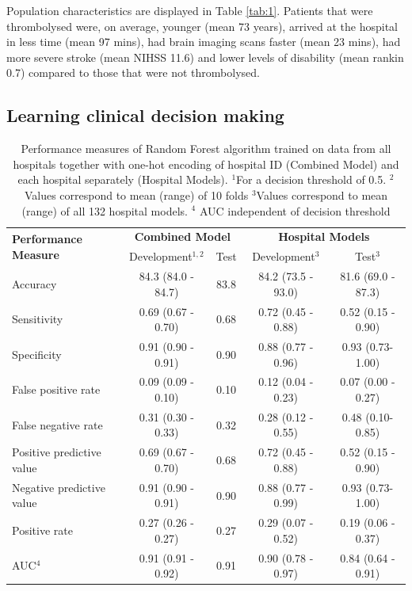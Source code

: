 \documentclass[12pt,a4paper, pdftex]{elsarticle}
\newcommand{\crjFIXME}[1]{\textcolor{blue}{[\textbf{FIXME} \textsl{#1}]}}
\begin{document}
Population characteristics are displayed in Table \ref{tab:1}. Patients that were thrombolysed were, on average, younger (mean 73 years), arrived at the hospital in less time (mean 97 mins), had brain imaging scans faster (mean 23 mins), had more severe stroke (mean NIHSS 11.6) and lower levels of disability (mean rankin 0.7) compared to those that were not thrombolysed. 


\subsection{Learning clinical decision making}



    \begin{table}[h!]
        \centering
        \begin{tabular}{|l|c|c|c|c|}
        \toprule
        \multirow{2}{*}{\bfseries Performance Measure} & 
        \multicolumn{2}{c|}{\bfseries Combined Model} &
        \multicolumn{2}{c|}{\bfseries Hospital Models} \\
        \cmidrule(lr){2-3}
        \cmidrule(lr){4-5}
        & Development$^{1,2}$ & Test & Development$^3$ & Test$^3$ \\ 
        \hline 
        Accuracy & 84.3 (84.0 - 84.7)& 83.8 & 84.2 (73.5 - 93.0) & 81.6 (69.0 - 87.3)\\
        Sensitivity & 0.69 (0.67 - 0.70)& 0.68 & 0.72 (0.45 - 0.88)& 0.52 (0.15 - 0.90)\\
        Specificity & 0.91 (0.90 - 0.91)& 0.90 & 0.88 (0.77 - 0.96)& 0.93 (0.73-1.00)\\
        False positive rate & 0.09 (0.09 - 0.10)& 0.10 & 0.12 (0.04 - 0.23)& 0.07 (0.00 - 0.27)\\
        False negative rate & 0.31 (0.30 - 0.33)& 0.32 & 0.28 (0.12 - 0.55) & 0.48 (0.10-0.85)\\
        Positive predictive value & 0.69 (0.67 - 0.70)& 0.68 & 0.72 (0.45 - 0.88)& 0.52 (0.15 - 0.90)\\
        Negative predictive value & 0.91 (0.90 - 0.91)& 0.90 & 0.88 (0.77 - 0.99)& 0.93 (0.73-1.00)\\
        Positive rate & 0.27 (0.26 - 0.27)& 0.27 & 0.29 (0.07 - 0.52)& 0.19 (0.06 - 0.37)\\
        AUC$^4$ & 0.91 (0.91 - 0.92)& 0.91 & 0.90 (0.78 - 0.97)& 0.84 (0.64 - 0.91)\\
        \bottomrule
        \end{tabular}
        \caption{Performance measures of Random Forest algorithm trained on data from all hospitals together with one-hot encoding of hospital ID (Combined Model) and each hospital separately (Hospital Models). $^1$For a decision threshold of 0.5. $^2$Values correspond to mean (range) of 10 folds $^3$Values correspond to mean (range) of all 132 hospital models. $^4$ AUC independent of decision threshold}
        \label{tab:2}
    \end{table}
\end{document}
